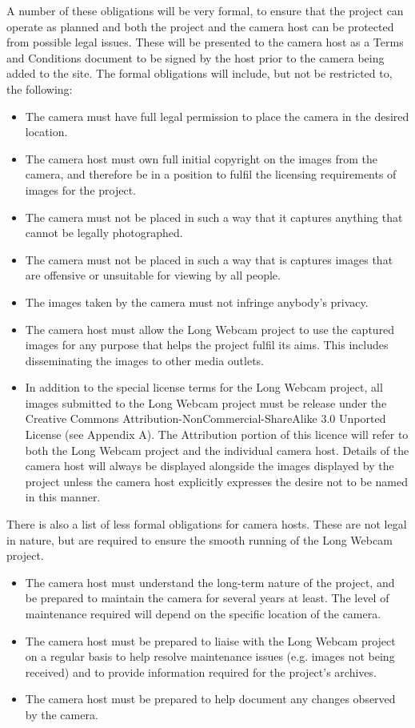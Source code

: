 \documentclass[11pt]{article}
\begin{document}
A number of these obligations will be very formal, to ensure that the project can operate as planned and both the project and the camera host can be protected from possible legal issues. These will be presented to the camera host as a Terms and Conditions document to be signed by the host prior to the camera being added to the site. The formal obligations will include, but not be restricted to, the following:

\begin{itemize}
\item The camera must have full legal permission to place the camera in the desired location.
\item The camera host must own full initial copyright on the images from the camera, and therefore be in a position to fulfil the licensing requirements of images for the project.
\item The camera must not be placed in such a way that it captures anything that cannot be legally photographed.
\item The camera must not be placed in such a way that is captures images that are offensive or unsuitable for viewing by all people.
\item The images taken by the camera must not infringe anybody's privacy.
\item The camera host must allow the Long Webcam project to use the captured images for any purpose that helps the project fulfil its aims. This includes disseminating the images to other media outlets.
\item In addition to the special license terms for the Long Webcam project, all images submitted to the Long Webcam project must be release under the Creative Commons Attribution-NonCommercial-ShareAlike 3.0 Unported License (see Appendix A). The Attribution portion of this licence will refer to both the Long Webcam project and the individual camera host. Details of the camera host will always be displayed alongside the images displayed by the project unless the camera host explicitly expresses the desire not to be named in this manner.
\end{itemize}

There is also a list of less formal obligations for camera hosts. These are not legal in nature, but are required to ensure the smooth running of the Long Webcam project.

\begin{itemize}
\item The camera host must understand the long-term nature of the project, and be prepared to maintain the camera for several years at least. The level of maintenance required will depend on the specific location of the camera.
\item The camera host must be prepared to liaise with the Long Webcam project on a regular basis to help resolve maintenance issues (e.g. images not being received) and to provide information required for the project's archives.
\item The camera host must be prepared to help document any changes observed by the camera.
\end{itemize}
\end{document}
